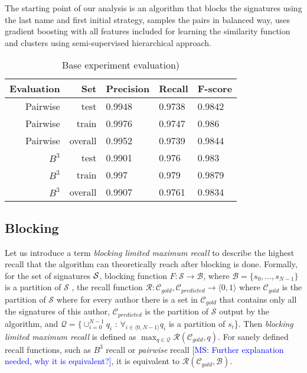 \documentclass{article}
\newcommand{\msnote}[1]{\textcolor{blue}{[MS: #1]}}
\begin{document}
The starting point of our analysis is an algorithm that blocks the signatures using the last
name and first initial strategy, samples the pairs in balanced way, uses gradient boosting
with all features included for learning the similarity function and clusters using
semi-supervised hierarchical approach.

\FloatBarrier
\begin{table}[H]
\caption{Base experiment evaluation)}
\centering
\begin{tabular}{|r|r|l|l|l|}
  \hline
  Evaluation & Set & Precision & Recall & F-score \\
  \hline
  Pairwise & test & 0.9948 & 0.9738 & 0.9842 \\
  \hline
  Pairwise & train & 0.9976 & 0.9747 & 0.986 \\
  \hline
  Pairwise & overall & 0.9952 & 0.9739 & 0.9844 \\
  \hline
  $B^3$ & test & 0.9901 & 0.976 & 0.983 \\
  \hline
  $B^3$ & train & 0.997 & 0.979 & 0.9879 \\
  \hline
  $B^3$ & overall & 0.9907 & 0.9761 & 0.9834 \\
  \hline
\end{tabular}
\end{table}

\subsection{Blocking}

Let us introduce a term \textit{blocking limited maximum recall} to describe the highest
recall that the algorithm can theoretically reach after blocking is done.
Formally, for the set of signatures ${\cal S}$, blocking function $F: \mathcal{S}
\rightarrow \mathcal{B}$, where $ \mathcal{B} = \{s_{0}, \ldots{} , s_{N-1}\}$ is a
partition of $\mathcal{S} $ , the recall function $\mathcal{R}: \mathcal{C}_{gold},
\mathcal{C}_{predicted} \rightarrow \langle0,1\rangle$ where $\mathcal{C}_{gold}$ is the
partition of $\mathcal{S}$ where for every author there is a set in $\mathcal{C}_{gold}$
that contains only all the signatures of this author, $\mathcal{C}_{predicted}$ is the
partition of $\mathcal{S}$ output by the algorithm, and $\mathcal{Q} = \{\cup_{i=0}^{N-1}
q_i $ : $\forall_{i \in \langle0,N-1\rangle} q_i$ is a partition of $s_i$\}. Then
\textit{blocking limited maximum recall} is defined as $\max_{q \in \mathcal{Q}}
\mathcal{R}(\mathcal{C}_{gold}, q)$. For sanely defined recall functions, such as $B^{3}$
recall or \textit{pairwise} recall \msnote{Further explanation needed, why it is
equivalent?}, it is equivalent to $\mathcal{R}(\mathcal{C}_{gold}, \mathcal{B})$.
\end{document}

